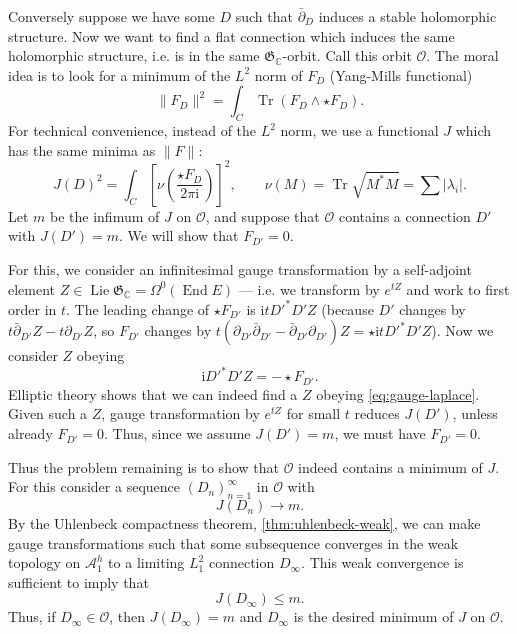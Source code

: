 \documentclass[12pt,letterpaper,reqno]{article}
\numberwithin{equation}{section}
\newcommand{\fG}{{\mathfrak G}}
\newcommand{\cO}{\ensuremath{\mathcal O}}
\newcommand{\cA}{\ensuremath{\mathcal A}}
\newcommand{\C}{\ensuremath{\mathbb C}}
\newcommand{\I}{{\mathrm i}}
\newcommand{\abs}[1]{\lvert#1\rvert}
\newcommand{\norm}[1]{\lVert#1\rVert}
\DeclareMathOperator{\Tr}{Tr}
\DeclareMathOperator{\End}{End}
\DeclareMathOperator{\Lie}{Lie}
\newcommand{\fixme}[1]{{\color{orange}{[#1]}}}
\begin{document}
\begin{pf}
Conversely suppose we have some $D$ such that $\bar\partial_D$
induces a stable holomorphic structure. Now we want to find a
flat connection which induces the same holomorphic structure,
i.e. is in the same $\fG_\C$-orbit. Call this orbit $\cO$.
The moral idea is to look for a minimum of the $L^2$ norm of $F_D$ (Yang-Mills
functional)
\begin{equation}
 \norm{F_D}^2 = \int_C \Tr (F_D \wedge \star F_D).
\end{equation}
For technical convenience, instead of the $L^2$ norm, we
use a functional $J$ which has the same minima as $\norm{F}$:
\begin{equation}
  J(D)^2 = \int_C \left[\nu\left(\frac{\star F_D}{2 \pi \I}\right)\right]^2, \qquad \nu(M) = \Tr \sqrt{M^*M} = \sum \abs{\lambda_i}.
\end{equation}
Let $m$ be the infimum of $J$ on $\cO$, and
suppose that $\cO$ contains a connection $D'$
with $J(D') = m$.
We will show that $F_{D'} = 0$.

For this, we consider an infinitesimal gauge transformation by
a self-adjoint element $Z \in \Lie \fG_\C = \Omega^0(\End E)$ ---
i.e. we transform by $e^{tZ}$ and work to first order in $t$.
The leading change of $\star F_{D'}$ is $\I t D'^* D' Z$
(because $D'$ changes by $t \bar\partial_{D'} Z - t \partial_{D'} Z$,
so $F_{D'}$ changes by $t (\partial_{D'} \bar\partial_{D'} - \bar\partial_{D'} \partial_{D'}) Z = \star \I t {D'}^* {D'} Z$). \fixme{check sign}
Now we consider $Z$ obeying
\begin{equation} \label{eq:gauge-laplace}
  \I D'^* D' Z = -\star F_{D'}.
\end{equation}
Elliptic theory shows that we can indeed
find a $Z$ obeying \eqref{eq:gauge-laplace}.
Given such a $Z$, gauge transformation by $e^{t Z}$ for small $t$
reduces $J(D')$, unless already $F_{D'} = 0$.
Thus, since we assume $J(D') = m$, we must have $F_{D'} = 0$.
\fixme{interpret as gradient flow?}

Thus the problem remaining is to show that  $\cO$ indeed contains 
a minimum of $J$.
For this consider a sequence $(D_n)_{n=1}^\infty$ in $\cO$ with
\begin{equation}
J(D_n) \to m.
\end{equation}
By the Uhlenbeck compactness
theorem, \autoref{thm:uhlenbeck-weak}, we can make gauge transformations
such that some subsequence converges in the weak topology on $\cA^h_1$ to
a limiting $L^2_1$ connection $D_\infty$. 
This weak convergence is sufficient to imply that 
\begin{equation} \label{eq:JDinfty}
J(D_\infty) \le m.
\end{equation}
\fixme{explain why} Thus, if
$D_\infty \in \cO$, then $J(D_\infty) = m$ and 
$D_\infty$ is the desired minimum of $J$ on $\cO$.


\end{pf}
\end{document}
